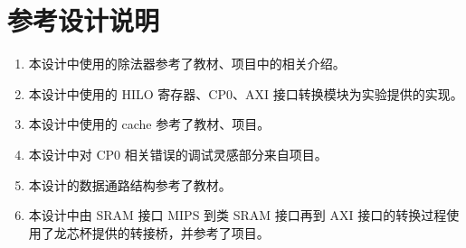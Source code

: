 \section{参考设计说明}

\begin{enumerate}
    \item 本设计中使用的除法器参考了教材\cite{computer-organization-and-design}、项目\cite{A-simple-MIPS-CPU}中的相关介绍。
    \item 本设计中使用的 HILO 寄存器、CP0、AXI 接口转换模块为实验提供的实现。
    \item 本设计中使用的 cache 参考了教材\cite{computer-organization-and-design}、项目\cite{MIPS_CPU}。
    \item 本设计中对 CP0 相关错误的调试灵感部分来自项目\cite{MIPS_CPU}。
    \item 本设计的数据通路结构参考了教材\cite{computer-organization-and-design}。
    \item 本设计中由 SRAM 接口 MIPS 到类 SRAM 接口再到 AXI 接口的转换过程使用了龙芯杯提供的转接桥，并参考了项目\cite{MIPS_CPU}。
\end{enumerate}
